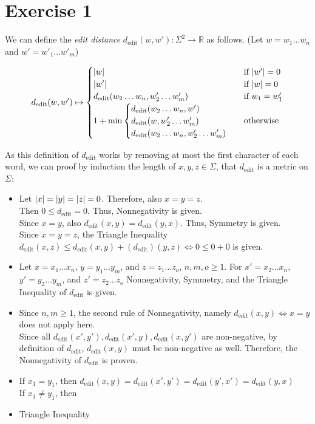 \documentclass[12pt]{article}
\DeclarePairedDelimiter\abs{\lvert}{\rvert}
\begin{document}
\section*{Exercise 1}
We can define the \textit{edit distance} $d_{\text{edit}}(w,w'): \Sigma^2 \rightarrow \mathbb{R}$ as follows. (Let $w=w_1 \dots w_n$ and $w'=w'_1 \dots w'_m$)

\begin{equation*}
	d_{\text{edit}}(w,w') \mapsto
	\begin{cases}
		\abs{w} & \text{if } \abs{w'}=0 \\
		\abs{w'} & \text{if } \abs{w}=0 \\
		d_{\text{edit}}(w_2 \dots w_n, w'_2 \dots w'_m) & \text{if } w_1 = w'_1 \\
		1 + \min
			\begin {cases}
				d_{\text{edit}}(w_2 \dots w_n, w') \\
				d_{\text{edit}}(w, w'_2 \dots w'_m) \\
				d_{\text{edit}}(w_2 \dots w_n, w'_2 \dots w'_m)
			\end{cases}
			& \text{otherwise}
	\end{cases}
\end{equation*}

As this definition of $d_{\text{edit}}$ works by removing at most the first character of each word, we can proof by induction the length of $x,y,z \in \Sigma$, that $d_{\text{edit}}$ is a metric on $\Sigma$:
\begin{itemize}
	\item	Let $\abs{x}=\abs{y}=\abs{z}=0$. Therefore, also $x=y=z$. \\
			Then $0 \leq d_{\text{edit}} = 0$. Thus, Nonnegativity is given. \\
			Since $x=y$, also $d_{\text{edit}}(x,y) = d_{\text{edit}}(y,x)$. Thus, Symmetry is given. \\
			Since $x=y=z$, the Triangle Inequality $d_{\text{edit}}(x,z) \leq d_{\text{edit}}(x,y) + (d_{\text{edit}})(y,z) \Leftrightarrow 0 \leq 0 + 0$ is given.
	\item 	Let $x=x_1 \dots x_n$, $y=y_1 \dots y_m$, and $z=z_1 \dots z_o$, $n,m,o \geq 1$. For $x'=x_2 \dots x_n$, $y'=y_2 \dots y_m$, and $z'=z_2 \dots z_o$ Nonnegativity, Symmetry, and the Triangle Inequality of $d_{\text{edit}}$ is given.
	\item	Since $n,m \geq 1$, the second rule of Nonnegativity, namely $d_{\text{edit}}(x,y) \Leftrightarrow x=y$ does not apply here. \\
			Since all $d_{\text{edit}}(x',y'), d_{\text{edit}}(x',y), d_{\text{edit}}(x,y')$ are non-negative, by definition of $d_{\text{edit}}$, $d_{\text{edit}}(x,y)$ must be non-negative as well. Therefore, the Nonnegativity of $d_{\text{edit}}$ is proven.
	\item	If $x_1 = y_1$, then $d_{\text{edit}}(x,y) = d_{\text{edit}}(x',y') = d_{\text{edit}}(y',x') = d_{\text{edit}}(y,x)$ \\
			If $x_1 \neq y_1$, then
	\item	Triangle Inequality
\end{itemize}
\end{document}
